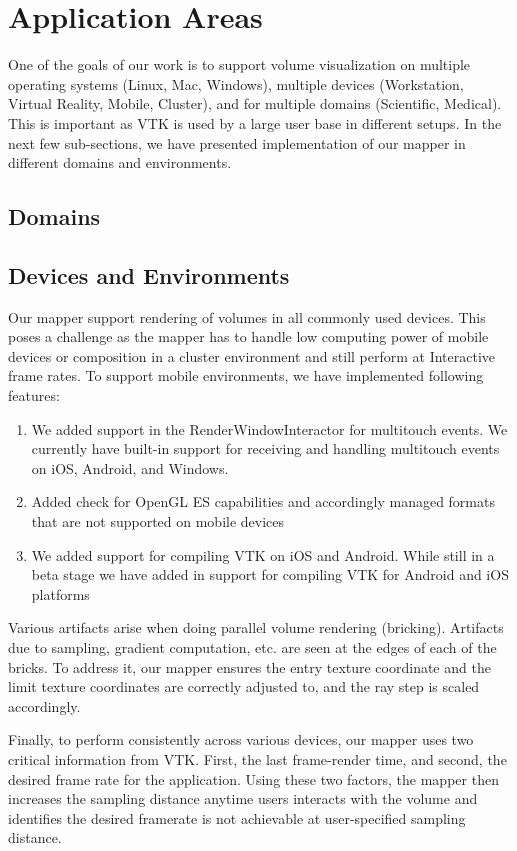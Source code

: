 \section{Application Areas}
\label{applicationareas}

One of the goals of our work is to support volume visualization on multiple
operating systems (Linux, Mac, Windows), multiple devices (Workstation,
Virtual Reality, Mobile, Cluster), and for multiple domains (Scientific, Medical).
This is important as VTK is used by a large user base in different setups.
In the next few sub-sections, we have presented implementation of
our mapper in different domains and environments.

\subsection{Domains}
\label{domains}

\subsection{Devices and Environments}
Our mapper support rendering of volumes in all commonly used devices. This poses
a challenge as the mapper has to handle low computing power of mobile devices or
composition in a cluster environment and still perform at Interactive frame rates.
To support mobile environments, we have implemented following features:
\begin{enumerate}
  \item We added support in the RenderWindowInteractor for multitouch
  events. We currently have built-in support for receiving and handling
  multitouch events on iOS, Android, and Windows.
  \item Added check for OpenGL ES capabilities and accordingly managed
  formats that are not supported on mobile devices
  \item We added support for compiling VTK on iOS and Android. While still
  in a beta stage we have added in support for compiling VTK for Android and
  iOS platforms
\end{enumerate}

Various artifacts arise when doing parallel volume rendering (bricking). Artifacts
due to sampling, gradient computation, etc.  are seen at the edges of each of the bricks.
To address it, our mapper ensures the entry texture coordinate and the limit texture
coordinates are correctly adjusted to, and the ray step is scaled accordingly.

Finally, to perform consistently across various devices, our mapper uses two
critical information from VTK. First, the last frame-render time, and second,
the desired frame rate for the application. Using these two factors,  the mapper
then increases the sampling distance anytime users interacts with
the volume and identifies the desired framerate is not achievable at user-specified
sampling distance.


\label{devices}